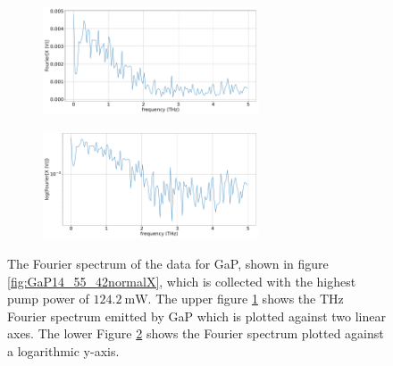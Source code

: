 \begin{figure}%
    \centering
    \begin{subfigure}{\columnwidth}%
        \centering
        \includegraphics[width=0.7\textwidth]{Plots/GaP14_55_42normalFX.pdf}%
        \label{fig:GaP14_55_42_fft}%
        \end{subfigure}%
    \hfill%
        \begin{subfigure}{\columnwidth}%
        \centering
        \includegraphics[width=0.7\textwidth]{Plots/GaP14_55_42normallog(FX).pdf}%
        \label{fig:GaP14_55_42_fft_log}%
    \end{subfigure}%
    \caption{The Fourier spectrum of the data for GaP, shown in figure \ref{fig:GaP14_55_42normalX}, which is collected with the highest pump power of $\SI{124.2}{\milli\W}$.
    The upper figure \ref{fig:GaP14_55_42_fft} shows the $\si{\tera\hertz}$ Fourier spectrum emitted by GaP which is plotted against two linear axes.
    The lower Figure \ref{fig:GaP14_55_42_fft_log} shows the Fourier spectrum plotted against a logarithmic y-axis.}%
    \label{fig:fourier_gap}%
\end{figure}%
\FloatBarrier
